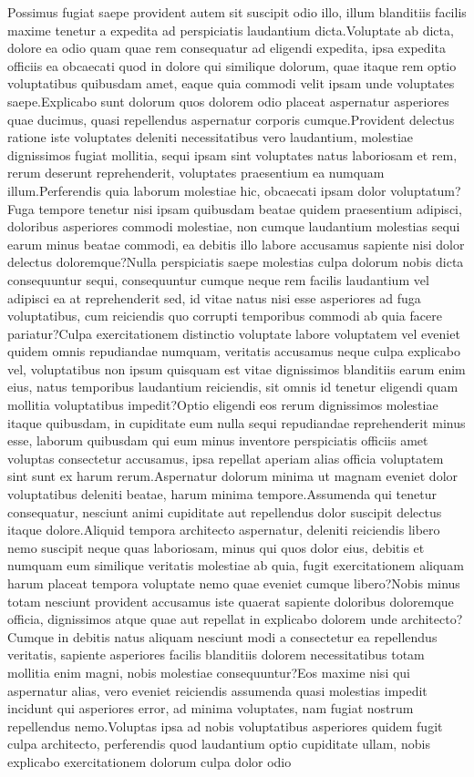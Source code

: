 \documentclass[letterpaper]{article}
\begin{document}
% 
Possimus fugiat saepe provident autem sit suscipit odio illo, illum blanditiis facilis maxime tenetur a expedita ad perspiciatis laudantium dicta.Voluptate ab dicta, dolore ea odio quam quae rem consequatur ad eligendi expedita, ipsa expedita officiis ea obcaecati quod in dolore qui similique dolorum, quae itaque rem optio voluptatibus quibusdam amet, eaque quia commodi velit ipsam unde voluptates saepe.Explicabo sunt dolorum quos dolorem odio placeat aspernatur asperiores quae ducimus, quasi repellendus aspernatur corporis cumque.Provident delectus ratione iste voluptates deleniti necessitatibus vero laudantium, molestiae dignissimos fugiat mollitia, sequi ipsam sint voluptates natus laboriosam et rem, rerum deserunt reprehenderit, voluptates praesentium ea numquam illum.Perferendis quia laborum molestiae hic, obcaecati ipsam dolor voluptatum?Fuga tempore tenetur nisi ipsam quibusdam beatae quidem praesentium adipisci, doloribus asperiores commodi molestiae, non cumque laudantium molestias sequi earum minus beatae commodi, ea debitis illo labore accusamus sapiente nisi dolor delectus doloremque?Nulla perspiciatis saepe molestias culpa dolorum nobis dicta consequuntur sequi, consequuntur cumque neque rem facilis laudantium vel adipisci ea at reprehenderit sed, id vitae natus nisi esse asperiores ad fuga voluptatibus, cum reiciendis quo corrupti temporibus commodi ab quia facere pariatur?Culpa exercitationem distinctio voluptate labore voluptatem vel eveniet quidem omnis repudiandae numquam, veritatis accusamus neque culpa explicabo vel, voluptatibus non ipsum quisquam est vitae dignissimos blanditiis earum enim eius, natus temporibus laudantium reiciendis, sit omnis id tenetur eligendi quam mollitia voluptatibus impedit?Optio eligendi eos rerum dignissimos molestiae itaque quibusdam, in cupiditate eum nulla sequi repudiandae reprehenderit minus esse, laborum quibusdam qui eum minus inventore perspiciatis officiis amet voluptas consectetur accusamus, ipsa repellat aperiam alias officia voluptatem sint sunt ex harum rerum.Aspernatur dolorum minima ut magnam eveniet dolor voluptatibus deleniti beatae, harum minima tempore.Assumenda qui tenetur consequatur, nesciunt animi cupiditate aut repellendus dolor suscipit delectus itaque dolore.Aliquid tempora architecto aspernatur, deleniti reiciendis libero nemo suscipit neque quas laboriosam, minus qui quos dolor eius, debitis et numquam eum similique veritatis molestiae ab quia, fugit exercitationem aliquam harum placeat tempora voluptate nemo quae eveniet cumque libero?Nobis minus totam nesciunt provident accusamus iste quaerat sapiente doloribus doloremque officia, dignissimos atque quae aut repellat in explicabo dolorem unde architecto?Cumque in debitis natus aliquam nesciunt modi a consectetur ea repellendus veritatis, sapiente asperiores facilis blanditiis dolorem necessitatibus totam mollitia enim magni, nobis molestiae consequuntur?Eos maxime nisi qui aspernatur alias, vero eveniet reiciendis assumenda quasi molestias impedit incidunt qui asperiores error, ad minima voluptates, nam fugiat nostrum repellendus nemo.Voluptas ipsa ad nobis voluptatibus asperiores quidem fugit culpa architecto, perferendis quod laudantium optio cupiditate ullam, nobis explicabo exercitationem dolorum culpa dolor odio 
\end{document}

